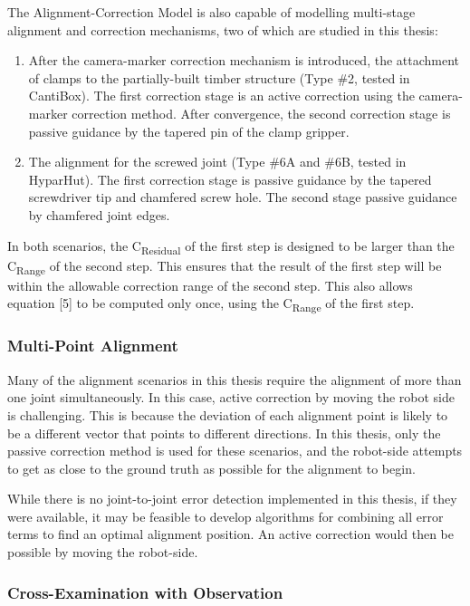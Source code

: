 \documentclass[11pt]{book}
\begin{document}
The Alignment-Correction Model is also capable of modelling multi-stage alignment and correction mechanisms, two of which are studied in this thesis:

\begin{enumerate}
	\item After the camera-marker correction mechanism is introduced, the attachment of clamps to the partially-built timber structure (Type $\#$2, tested in CantiBox). The first correction stage is an active correction using the camera-marker correction method. After convergence, the second correction stage is passive guidance by the tapered pin of the clamp gripper.

	\item The alignment for the screwed joint (Type $\#$6A and $\#$6B, tested in HyparHut). The first correction stage is passive guidance by the tapered screwdriver tip and chamfered screw hole. The second stage passive guidance by chamfered joint edges. 

\end{enumerate}
In both scenarios, the C\textsubscript{Residual} of the first step is designed to be larger than the C\textsubscript{Range} of the second step. This ensures that the result of the first step will be within the allowable correction range of the second step. This also allows equation [5] to be computed only once, using the C\textsubscript{Range }of the first step.

\subsubsection{Multi-Point Alignment}

Many of the alignment scenarios in this thesis require the alignment of more than one joint simultaneously. In this case, active correction by moving the robot side is challenging. This is because the deviation of each alignment point is likely to be a different vector that points to different directions. In this thesis, only the passive correction method is used for these scenarios, and the robot-side attempts to get as close to the ground truth as possible for the alignment to begin. 

While there is no joint-to-joint error detection implemented in this thesis, if they were available, it may be feasible to develop algorithms for combining all error terms to find an optimal alignment position. An active correction would then be possible by moving the robot-side.

\subsubsection{Cross-Examination with Observation}
\end{document}
